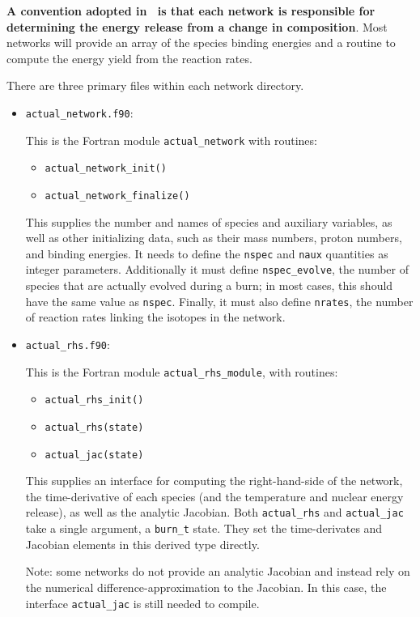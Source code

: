 {\bf A convention adopted in \microphysics\ is that each network
is responsible for determining the energy release from a change
in composition}.  Most networks will provide an array of the species
binding energies and a routine to compute the energy yield from
the reaction rates.

There are three primary files within each network directory.

\begin{itemize}

\item {\tt actual\_network.f90}:

  This is the Fortran module {\tt actual\_network} with routines:
  \begin{itemize}
  \item {\tt actual\_network\_init()}
  \item {\tt actual\_network\_finalize()}
  \end{itemize}

  This supplies the number and names of species and auxiliary
  variables, as well as other initializing data, such as their mass
  numbers, proton numbers, and binding energies. It needs to define
  the {\tt nspec} and {\tt naux} quantities as integer
  parameters. Additionally it must define {\tt nspec\_evolve}, the
  number of species that are actually evolved during a burn; in most
  cases, this should have the same value as {\tt nspec}.  Finally, it
  must also define {\tt nrates}, the number of reaction rates linking
  the isotopes in the network.

\item {\tt actual\_rhs.f90}:

  This is the Fortran module {\tt actual\_rhs\_module}, with routines:
  \begin{itemize}
  \item {\tt actual\_rhs\_init()}
  \item {\tt actual\_rhs(state)}
  \item {\tt actual\_jac(state)}
  \end{itemize}

  This supplies an interface for computing the right-hand-side of the
  network, the time-derivative of each species (and the temperature
  and nuclear energy release), as well as the analytic Jacobian.
  Both {\tt actual\_rhs} and {\tt actual\_jac} take a single argument,
  a {\tt burn\_t} state.  They set the time-derivates and Jacobian
  elements in this derived type directly.

  Note: some networks do not provide an analytic Jacobian and instead
  rely on the numerical difference-approximation to the Jacobian.  In
  this case, the interface {\tt actual\_jac} is still needed to compile.


\end{itemize}
